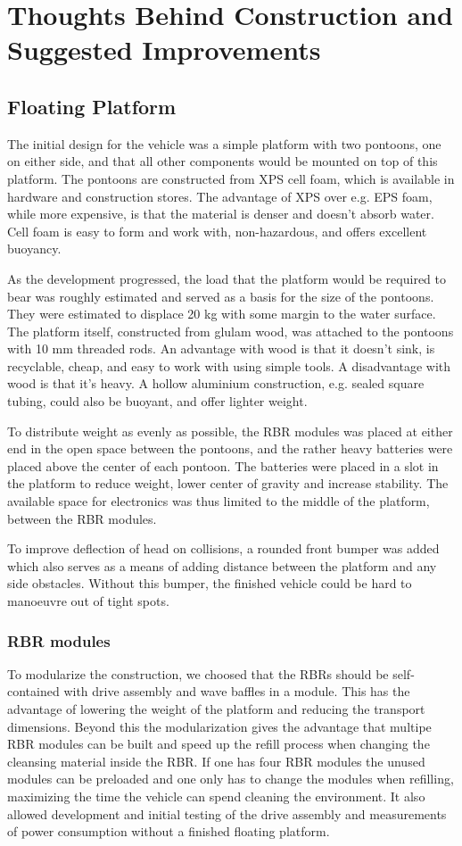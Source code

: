 \section{Thoughts Behind Construction and Suggested Improvements}
\subsection{Floating Platform}
The initial design for the vehicle was a simple platform with two pontoons, one on either side, and that all other components would be mounted on top of this platform.  The pontoons are constructed from XPS cell foam, which is available in hardware and construction stores. The advantage of XPS over e.g. EPS foam, while more expensive, is that the material is denser and doesn’t absorb water. Cell foam is easy to form and work with, non-hazardous, and offers excellent buoyancy.

As the development progressed, the load that the platform would be required to bear was roughly estimated and served as a basis for the size of the pontoons. They were estimated to displace 20 kg with some margin to the water surface. The platform itself, constructed from glulam wood, was attached to the pontoons with 10 mm threaded rods. An advantage with wood is that it doesn’t sink, is recyclable, cheap, and easy to work with using simple tools. A disadvantage with wood is that it’s heavy. A hollow aluminium construction, e.g. sealed square tubing, could also be buoyant, and offer lighter weight. 

To distribute weight as evenly as possible, the RBR modules was placed at either end in the open space between the pontoons, and the rather heavy batteries were placed above the center of each pontoon. The batteries were placed in a slot in the platform to reduce weight, lower center of gravity and increase stability. The available space for electronics was thus limited to the middle of the platform, between the RBR modules.

To improve deflection of head on collisions, a rounded front bumper was added which also serves as a means of adding distance between the platform and any side obstacles. Without this bumper, the finished vehicle could be hard to manoeuvre out of tight spots.

\subsubsection{RBR modules}
To modularize the construction, we choosed that the RBRs should be self-contained with drive assembly and wave baffles in a module. This has the advantage of lowering the weight of the platform and reducing the transport dimensions. Beyond this the modularization gives the advantage that multipe RBR modules can be built and speed up the refill process when changing the cleansing material inside the RBR. If one has four RBR modules the unused modules can be preloaded and one only has to change the modules when refilling, maximizing the time the vehicle can spend cleaning the environment. It also allowed development and initial testing of the drive assembly and measurements of power consumption without a finished floating platform. 

